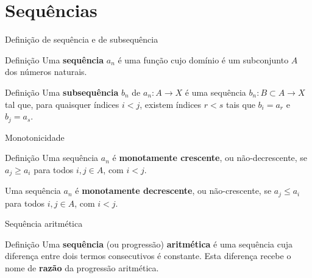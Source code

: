 \section*{Sequências}

\begin{frame}[fragile]{Definição de sequência e de subsequência}

    \begin{block}{Definição}
        Uma \textbf{sequência} $a_n$ é uma função cujo domínio é um subconjunto $A$ dos números naturais.
    \end{block}

    \vspace{0.2in}

    \begin{block}{Definição}
        Uma \textbf{subsequência} $b_n$ de $a_n: A \to X$ é uma sequência $b_n: B\subset A \to X$ tal que, para quaisquer índices $i < j$, existem índices
        $r < s$ tais que $b_i = a_r$ e $b_j = a_s$.
    \end{block}

\end{frame}

\begin{frame}[fragile]{Monotonicidade}

    \begin{block}{Definição}
        Uma sequência $a_n$ é \textbf{monotamente crescente}, ou não-decrescente, se $a_j \geq a_i$ para todos $i, j\in A$, com $i < j$.

        Uma sequência $a_n$ é \textbf{monotamente decrescente}, ou não-crescente, se $a_j\leq a_i$ para todos $i, j\in A$, com $i < j$.
    \end{block}

\end{frame}

\begin{frame}[fragile]{Sequência aritmética}

    \begin{block}{Definição}
        Uma \textbf{sequência} (ou progressão) \textbf{aritmética} é uma sequência cuja diferença entre dois termos consecutivos é constante. Esta diferença recebe o nome de \textbf{razão} da progressão aritmética.
    \end{block}

\end{frame}

